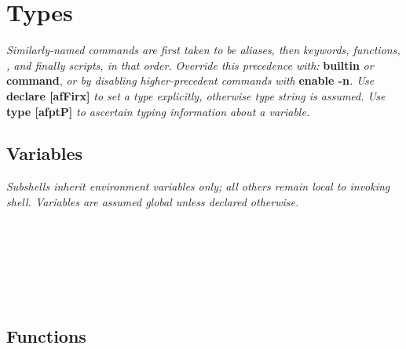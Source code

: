 \section{Types}

\textit{Similarly-named commands are first taken to be aliases, then keywords, functions, , and finally scripts, in that order. Override this precedence with: }\textbf{builtin} \textit{ or } \textbf{command}, \textit{ or by disabling higher-precedent commands with }\textbf{enable -n}\textit{. Use }\textbf{declare [afFirx]}\textit{ to set a type explicitly, otherwise type string is assumed. Use }\textbf{type [afptP]}\textit{ to ascertain typing information about a variable.}



\subsection*{Variables}

\textit{Subshells inherit environment variables only; all others remain local to invoking shell. Variables are assumed global unless declared otherwise.}\\
\\
\\
\\
\\
\\
\\


\subsection*{Functions}

\\
\entry{30mm}{\{ }{} \\
 \\
\entry{30mm}{\} }{} \\

\\
\\

